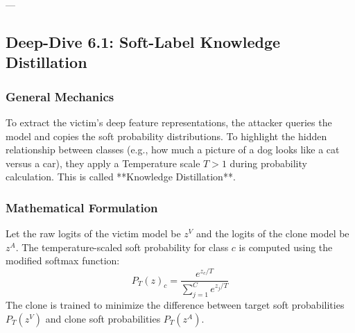 \documentclass{article}
\begin{document}
---

\subsection{Deep-Dive 6.1: Soft-Label Knowledge Distillation}

\subsubsection{General Mechanics}
To extract the victim's deep feature representations, the attacker queries the model and copies the soft probability distributions. To highlight the hidden relationship between classes (e.g., how much a picture of a dog looks like a cat versus a car), they apply a Temperature scale $T > 1$ during probability calculation. This is called **Knowledge Distillation**.

\subsubsection{Mathematical Formulation}
Let the raw logits of the victim model be $z^V$ and the logits of the clone model be $z^A$. The temperature-scaled soft probability for class $c$ is computed using the modified softmax function:
\begin{equation}
    P_T(z)_c = \frac{e^{z_c / T}}{\sum_{j=1}^C e^{z_j / T}}
\end{equation}
The clone is trained to minimize the difference between target soft probabilities $P_T(z^V)$ and clone soft probabilities $P_T(z^A)$.
\end{document}
